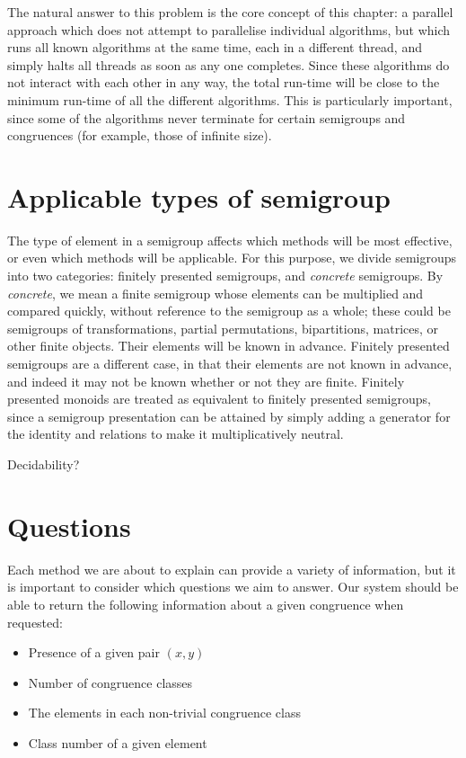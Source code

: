 The natural answer to this problem is the core concept of this chapter: a
parallel approach which does not attempt to parallelise individual algorithms,
but which runs all known algorithms at the same time, each in a different
thread, and simply halts all threads as soon as any one completes.  Since these
algorithms do not interact with each other in any way, the total run-time will
be close to the minimum run-time of all the different algorithms.  This is
particularly important, since some of the algorithms never terminate for certain
semigroups and congruences (for example, those of infinite size).

\section{Applicable types of semigroup}

The type of element in a semigroup affects which methods will be most effective,
or even which methods will be applicable.  For this purpose, we divide
semigroups into two categories: finitely presented semigroups, and
\textit{concrete} semigroups.  By \textit{concrete}, we mean a finite semigroup
whose elements can be multiplied and compared quickly, without reference to the
semigroup as a whole; these could be semigroups of transformations, partial
permutations, bipartitions, matrices, or other finite objects.  Their elements
will be known in advance.  Finitely presented semigroups are a different case,
in that their elements are not known in advance, and indeed it may not be known
whether or not they are finite.  Finitely presented monoids are treated as
equivalent to finitely presented semigroups, since a semigroup presentation can
be attained by simply adding a generator for the identity and relations to make
it multiplicatively neutral.

Decidability?

\section{Questions}

Each method we are about to explain can provide a variety of information, but it
is important to consider which questions we aim to answer.  Our system should be
able to return the following information about a given congruence when
requested:

\begin{itemize}
\item Presence of a given pair $(x,y)$
\item Number of congruence classes
\item The elements in each non-trivial congruence class
\item Class number of a given element
\end{itemize}


